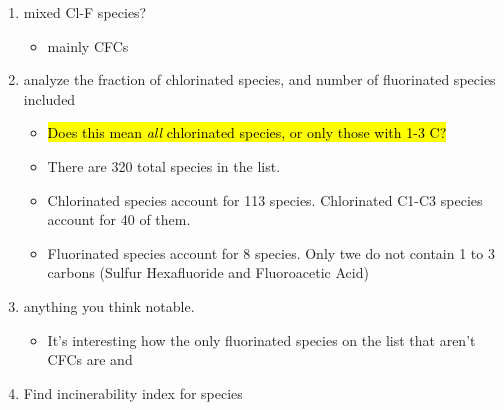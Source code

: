 \documentclass{article}
\begin{document}
\begin{enumerate}
\begin{table}
\begin{tabular}
        \end{tabular}
    \end{table}
    \item mixed Cl-F species?
    \begin{itemize}
        \item mainly CFCs
    \end{itemize}
    \item analyze the fraction of chlorinated species, and number of fluorinated species included
    \begin{itemize}
        \item \hl{Does this mean \emph{all} chlorinated species, or only those with 1-3 C?}
        \item There are 320 total species in the list. 
        \item Chlorinated species account for 113 species. Chlorinated C1-C3 species account for 40 of them.
        \item Fluorinated species account for 8 species. Only twe do not contain 1 to 3 carbons (Sulfur Hexafluoride and Fluoroacetic Acid)
    \end{itemize}
    \item anything you think notable.
    \begin{itemize}
        \item It's interesting how the only fluorinated species on the list that aren't CFCs are  and 
    \end{itemize}
    \item Find incinerability index for species %
\end{enumerate}
 
\end{document}
